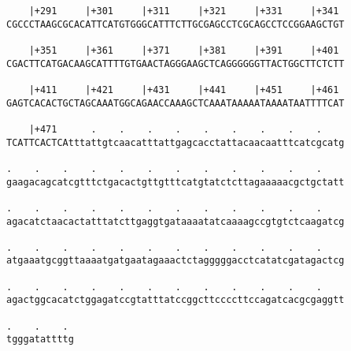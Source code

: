 \documentclass{article}
\begin{document}
\begin{Verbatim}
    |+291     |+301     |+311     |+321     |+331     |+341 
CGCCCTAAGCGCACATTCATGTGGGCATTTCTTGCGAGCCTCGCAGCCTCCGGAAGCTGT
                                                            
    |+351     |+361     |+371     |+381     |+391     |+401 
CGACTTCATGACAAGCATTTTGTGAACTAGGGAAGCTCAGGGGGGTTACTGGCTTCTCTT
                                                            
    |+411     |+421     |+431     |+441     |+451     |+461 
GAGTCACACTGCTAGCAAATGGCAGAACCAAAGCTCAAATAAAAATAAAATAATTTTCAT
                                                            
    |+471      .    .    .    .    .    .    .    .    .    
TCATTCACTCAtttattgtcaacatttattgagcacctattacaacaatttcatcgcatg
                                                            
.    .    .    .    .    .    .    .    .    .    .    .    
gaagacagcatcgtttctgacactgttgtttcatgtatctcttagaaaaacgctgctatt
                                                            
.    .    .    .    .    .    .    .    .    .    .    .    
agacatctaacactatttatcttgaggtgataaaatatcaaaagccgtgtctcaagatcg
                                                            
.    .    .    .    .    .    .    .    .    .    .    .    
atgaaatgcggttaaaatgatgaatagaaactctagggggacctcatatcgatagactcg
                                                            
.    .    .    .    .    .    .    .    .    .    .    .    
agactggcacatctggagatccgtatttatccggcttccccttccagatcacgcgaggtt
                                                            
.    .    . 
tgggatattttg
            
            
\end{Verbatim}
\end{document}
